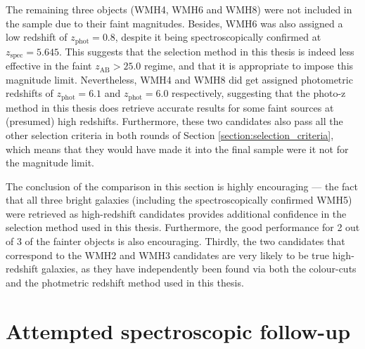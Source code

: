 The remaining three objects (WMH4, WMH6 and WMH8) were not included in the \DESVIDEO sample due to their faint magnitudes. Besides, WMH6 was also assigned a low \DESVIDEO redshift of $z_{\mathrm{phot}}=0.8$, despite it being spectroscopically confirmed at $z_{\mathrm{spec}}=5.645$. This suggests that the selection method in this thesis is indeed less effective in the faint $z_{\mathrm{AB}}>25.0$ regime, and that it is appropriate to impose this magnitude limit. Nevertheless, WMH4 and WMH8 did get assigned \DESVIDEO photometric redshifts of $z_{\mathrm{phot}}=6.1$ and $z_{\mathrm{phot}}=6.0$ respectively, suggesting that the photo-z method in this thesis does retrieve accurate results for some faint sources at (presumed) high redshifts. Furthermore, these two candidates also pass all the other selection criteria in both rounds of Section \ref{section:selection_criteria}, which means that they would have made it into the final sample were it not for the magnitude limit. \par

The conclusion of the comparison in this section is highly encouraging ---  the fact that all three bright \cite{2013AJ....145....4W} galaxies (including the spectroscopically confirmed WMH5) were retrieved as high-redshift candidates provides additional confidence in the selection method used in this thesis. Furthermore, the good performance for 2 out of 3 of the fainter objects is also encouraging. Thirdly, the two \DESVIDEO candidates that correspond to the WMH2 and WMH3 candidates are very likely to be true high-redshift galaxies, as they have independently been found via both the \cite{2013AJ....145....4W} colour-cuts and the photmetric redshift method used in this thesis. \par 




\section{Attempted spectroscopic follow-up}\label{subsection:spectroscopic_confirmation}

